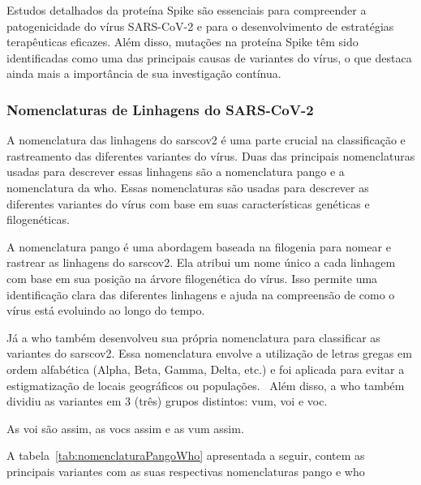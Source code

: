 Estudos detalhados da proteína Spike são essenciais para compreender a patogenicidade do vírus SARS-CoV-2 e para o desenvolvimento de estratégias terapêuticas eficazes. Além disso, mutações na proteína Spike têm sido identificadas como uma das principais causas de variantes do vírus, o que destaca ainda mais a importância de sua investigação contínua.

\subsubsection{Nomenclaturas de Linhagens do SARS-CoV-2}
A nomenclatura das linhagens do \gls{sarscov2} é uma parte crucial na classificação e rastreamento das diferentes variantes do vírus. Duas das principais nomenclaturas usadas para descrever essas linhagens são a nomenclatura \gls{pango} e a nomenclatura da \gls{who}. Essas nomenclaturas são usadas para descrever as diferentes variantes do vírus com base em suas características genéticas e filogenéticas.

A nomenclatura \gls{pango} é uma abordagem baseada na filogenia para nomear e rastrear as linhagens do \gls{sarscov2}. Ela atribui um nome único a cada linhagem com base em sua posição na árvore filogenética do vírus. Isso permite uma identificação clara das diferentes linhagens e ajuda na compreensão de como o vírus está evoluindo ao longo do tempo.~\cite{pango_rambaut_2020}

Já a \gls{who} também desenvolveu sua própria nomenclatura para classificar as variantes do \gls{sarscov2}. Essa nomenclatura envolve a utilização de letras gregas em ordem alfabética (Alpha, Beta, Gamma, Delta, etc.) e foi aplicada para evitar a estigmatização de locais geográficos ou populações.~\cite{who_variants} Além disso, a \gls{who} também dividiu as variantes em 3 (três) grupos distintos: \gls{vum}, \gls{voi} e \gls{voc}.

As voi são assim, as vocs assim e as vum assim.

A tabela~\ref{tab:nomenclaturaPangoWho} apresentada a seguir, contem as principais variantes com as suas respectivas nomenclaturas \gls{pango} e \gls{who}

